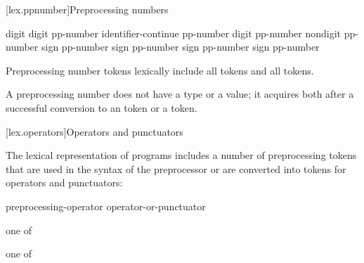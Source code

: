 [lex.ppnumber]{Preprocessing numbers}

%
\begin{bnf}
\br
    digit\br
     digit\br
    pp-number identifier-continue\br
    pp-number  digit\br
    pp-number  nondigit\br
    pp-number  sign\br
    pp-number  sign\br
    pp-number  sign\br
    pp-number  sign\br
    pp-number 
\end{bnf}

\pnum
Preprocessing number tokens lexically include
all  tokens and
all  tokens.

\pnum
A preprocessing number does not have a type or a value; it acquires both
after a successful conversion to
an  token or
a  token.%

[lex.operators]{Operators and punctuators}

\pnum
{}%
%
The lexical representation of \Cpp{} programs includes a number of
preprocessing tokens that are used in the syntax of the preprocessor or
are converted into tokens for operators and punctuators:

\begin{bnf}
\br
    preprocessing-operator\br
    operator-or-punctuator
\end{bnf}

\begin{bnf}
\obeyspaces
{} \textnormal{one of}\br
    \terminal{\#        \#\#       \%:       \%:\%:}
\end{bnf}

\begin{bnf}
\obeyspaces
{} \textnormal{one of}\br
    \terminal{\{        \}        [        ]        (        )}\br
    \br
    \br
    \terminal{!        +        -        *        /        \%        \caret{}        \&        |}\br
    \terminal{=        +=       -=       *=       /=       \%=       \caret{}=       \&=       |=}\br
    \terminal{==       !=       <        >        <=       >=       <=>      \&\&       ||}\br
    \terminal{<<       >>       <<=      >>=      ++       --       ,}\br
    \br
\end{bnf}

